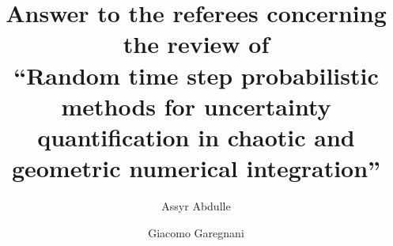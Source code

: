 \usepackage[T1]{fontenc}
\usepackage{lmodern}
\usepackage[utf8x]{inputenx}
\usepackage{microtype}
\usepackage{framed}
\usepackage{listings}
\usepackage{vmargin}
\usepackage{setspace}
\usepackage{mathrsfs, mathenv}
\usepackage{amsmath, amsthm, amssymb, amsfonts, amscd}
\usepackage{graphicx}
\usepackage{epstopdf}
\usepackage[svgnames]{xcolor}
\usepackage{hyperref}
\usepackage[capitalise]{cleveref}
\usepackage{xparse}
\hypersetup{citecolor=blue, colorlinks=true, linkcolor=black}
\setlength{\parskip}{6pt}
\setlength\parindent{0pt}
\usepackage{subcaption}
\usepackage{bbm}
\usepackage{cite}
\usepackage{verbatim}
\usepackage{pgfplots}
\usepackage{tikz}
\usepackage{color}
\usepackage{stmaryrd}

\theoremstyle{plain}
\newtheorem{theorem}{Theorem}
\newtheorem{corollary}{Corollary}
\newtheorem{lemma}{Lemma}
\newtheorem{proposition}{Proposition}

\theoremstyle{definition}
\newtheorem{definition}{Definition}

\theoremstyle{remark}
\newtheorem{remark}{Remark}
\newtheorem{assumption}{Assumption}
\newtheorem{example}{Example}


\ifpdf
\else
\fi

\usepackage{mathtools}

\usepackage{booktabs}

\usepackage{pgfplots}
\usepackage{tikz}
\usetikzlibrary{arrows,decorations.pathmorphing,backgrounds,positioning,fit,matrix}
\usepackage[labelfont=bf]{caption}
\setlength{\belowcaptionskip}{-5pt}
\usepackage{here}
\usepackage[font=normal]{subcaption}

\usepackage{enumitem}

\newcommand{\creflastconjunction}{, and~}


\newcommand{\email}[1]{\href{#1}{#1}}
\newcommand{\TheTitle}{Answer to the referees concerning the review of \\ ``Random time step probabilistic methods for uncertainty quantification in chaotic and geometric numerical integration''} 
\newcommand{\TheAuthors}{A. Abdulle, G. Garegnani}
\title{{\TheTitle}}
\author{Assyr Abdulle \and Giacomo Garegnani}
\date{}

